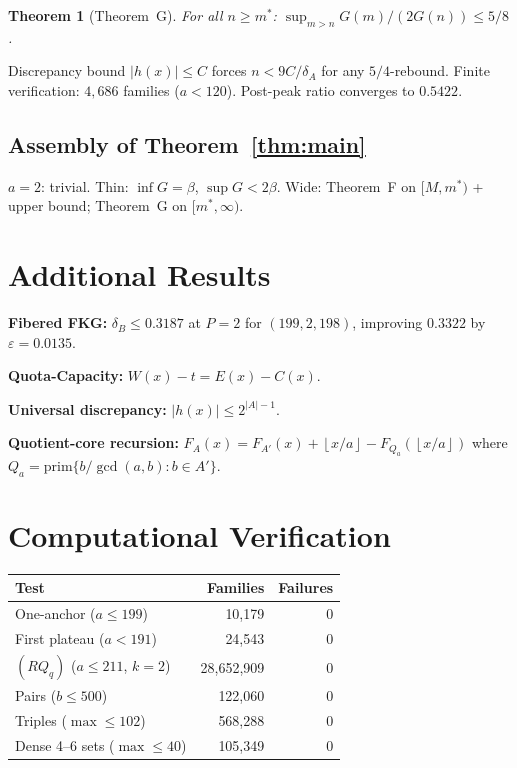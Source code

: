 \documentclass[11pt,a4paper]{article}
\newtheorem{theorem}{Theorem}[section]
\theoremstyle{definition}
\newcommand{\floor}[1]{\left\lfloor #1 \right\rfloor}
\begin{document}
\begin{theorem}[Theorem~G]\label{thm:postpeak}
For all $n \geq m^*$: $\sup_{m>n} G(m)/(2G(n)) \leq 5/8$.
\end{theorem}

Discrepancy bound $|h(x)| \leq C$ forces $n < 9C/\delta_A$ for any
$5/4$-rebound. Finite verification: $4{,}686$ families ($a < 120$).
Post-peak ratio converges to $0.5422$.

\subsection{Assembly of Theorem~\ref{thm:main}}
$a = 2$: trivial. Thin: $\inf G = \beta$, $\sup G < 2\beta$. Wide:
Theorem~F on $[M, m^*)$ + upper bound; Theorem~G on $[m^*, \infty)$.

\section{Additional Results}

\textbf{Fibered FKG:} $\delta_B \leq 0.3187$ at $P{=}2$ for
$(199,2,198)$, improving $0.3322$ by $\varepsilon = 0.0135$.

\textbf{Quota-Capacity:} $W(x) - t = E(x) - C(x)$.

\textbf{Universal discrepancy:} $|h(x)| \leq 2^{|A|-1}$.

\textbf{Quotient-core recursion:}
$F_A(x) = F_{A'}(x) + \floor{x/a} - F_{Q_a}(\floor{x/a})$
where $Q_a = \mathrm{prim}\{b/\gcd(a,b) : b \in A'\}$.

\section{Computational Verification}

\begin{center}
\begin{tabular}{lrr}
\toprule
\textbf{Test} & \textbf{Families} & \textbf{Failures} \\
\midrule
One-anchor ($a \leq 199$) & 10,179 & 0 \\
First plateau ($a < 191$) & 24,543 & 0 \\
$(RQ_q)$ ($a \leq 211$, $k{=}2$) & 28,652,909 & 0 \\
Pairs ($b \leq 500$) & 122,060 & 0 \\
Triples ($\max \leq 102$) & 568,288 & 0 \\
Dense 4--6 sets ($\max \leq 40$) & 105,349 & 0 \\
\bottomrule
\end{tabular}
\end{center}
\end{document}
